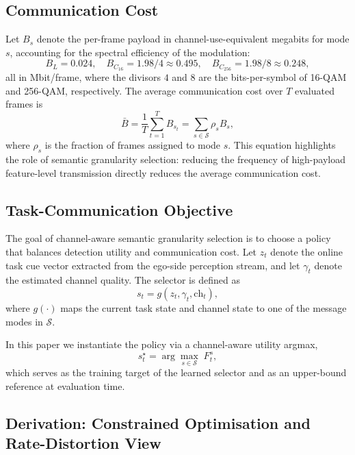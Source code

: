 \documentclass[journal]{IEEEtran}
\begin{document}
\subsection{Communication Cost}

Let $B_s$ denote the per-frame payload in channel-use-equivalent megabits for mode $s$, accounting for the spectral efficiency of the modulation:
\begin{equation}
B_L = 0.024, \quad B_{C_{16}} = 1.98/4 \approx 0.495, \quad B_{C_{256}} = 1.98/8 \approx 0.248,
\end{equation}
all in Mbit/frame, where the divisors $4$ and $8$ are the bits-per-symbol of 16-QAM and 256-QAM, respectively. The average communication cost over $T$ evaluated frames is
\begin{equation}
\bar{B} = \frac{1}{T}\sum_{t=1}^{T} B_{s_t} = \sum_{s \in \mathcal{S}} \rho_s B_s,
\end{equation}
where $\rho_s$ is the fraction of frames assigned to mode $s$. This equation highlights the role of semantic granularity selection: reducing the frequency of high-payload feature-level transmission directly reduces the average communication cost.

\subsection{Task-Communication Objective}

The goal of channel-aware semantic granularity selection is to choose a policy that balances detection utility and communication cost. Let $z_t$ denote the online task cue vector extracted from the ego-side perception stream, and let $\gamma_t$ denote the estimated channel quality. The selector is defined as
\begin{equation}
s_t = g(z_t, \gamma_t, \text{ch}_t),
\label{eq:selector}
\end{equation}
where $g(\cdot)$ maps the current task state and channel state to one of the message modes in $\mathcal{S}$.

In this paper we instantiate the policy via a channel-aware utility argmax,
\begin{equation}
s_t^\star = \arg\max_{s \in \mathcal{S}}\; F_t^{s},
\label{eq:oracle}
\end{equation}
which serves as the training target of the learned selector and as an upper-bound reference at evaluation time.

\subsection{Derivation: Constrained Optimisation and Rate-Distortion View}\label{sec:derivation}
\end{document}
